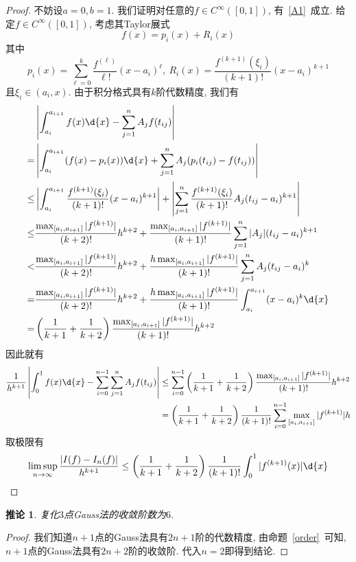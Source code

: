 \documentclass[a4paper]{ctexart}
\theoremstyle{plain}
\newtheorem{cor}[prop]{推论}
\theoremstyle{remark}
\numberwithin{equation}{section}
\begin{document}
\begin{proof}
    不妨设$a=0,b=1$.
    我们证明对任意的$f\in C^\infty([0,1])$, 有~\eqref{A1}~成立.
    给定$f\in C^\infty([0,1])$, 考虑其Taylor展式
    \[f(x)=p_i(x)+R_i(x)\]
    其中
    \[p_i(x)=\sum_{\ell=0}^k\frac{f^{(\ell)}}{\ell!}(x-a_i)^\ell,\ R_i(x)=\frac{f^{(k+1)}(\xi_i)}{(k+1)!}(x-a_i)^{k+1}\]
    且$\xi_i\in(a_i,x)$.
    由于积分格式具有$k$阶代数精度, 我们有
    \begin{align*}
        &\left|\int_{a_i}^{a_{i+1}}f(x)\d{x}-\sum_{j=1}^nA_jf(t_{ij})\right|\\
        =&\left|\int_{a_i}^{a_{i+1}}(f(x)-p_i(x))\d{x}+\sum_{j=1}^nA_j(p_i(t_{ij})-f(t_{ij}))\right|\\
        \leq&\left|\int_{a_i}^{a_{i+1}}\frac{f^{(k+1)}(\xi_i)}{(k+1)!}(x-a_i)^{k+1}\right|+\left|\sum_{j=1}^n\frac{f^{(k+1)}(\xi_i)}{(k+1)!}A_j(t_{ij}-a_i)^{k+1}\right|\\
        \leq&\frac{\max_{[a_i,a_{i+1}]}|f^{(k+1)}|}{(k+2)!}h^{k+2}+\frac{\max_{[a_i,a_{i+1}]}|f^{(k+1)}|}{(k+1)!}\sum_{j=1}^n|A_j|(t_{ij}-a_i)^{k+1}\\
        <&\frac{\max_{[a_i,a_{i+1}]}|f^{(k+1)}|}{(k+2)!}h^{k+2}+\frac{h\max_{[a_i,a_{i+1}]}|f^{(k+1)}|}{(k+1)!}\sum_{j=1}^nA_j(t_{ij}-a_i)^{k}\\
        =&\frac{\max_{[a_i,a_{i+1}]}|f^{(k+1)}|}{(k+2)!}h^{k+2}+\frac{h\max_{[a_i,a_{i+1}]}|f^{(k+1)}|}{(k+1)!}\int_{a_i}^{a_{i+1}}(x-a_i)^k\d{x}\\
        =&\left(\frac{1}{k+1}+\frac{1}{k+2}\right)\frac{\max_{[a_i,a_{i+1}]}|f^{(k+1)}|}{(k+1)!}h^{k+2}
    \end{align*}
    因此就有
    \begin{align*}
        \frac{1}{h^{k+1}}\left|\int_0^1f(x)\d{x}-\sum_{i=0}^{n-1}\sum_{j=1}^nA_jf(t_{ij})\right|&\leq\sum_{i=0}^{n-1}\left(\frac{1}{k+1}+\frac{1}{k+2}\right)\frac{\max_{[a_i,a_{i+1}]}|f^{(k+1)}|}{(k+1)!}h^{k+2}\\
        &=\left(\frac{1}{k+1}+\frac{1}{k+2}\right)\frac{1}{(k+1)!}\sum_{i=0}^{n-1}\max_{[a_i,a_{i+1}]}|f^{(k+1)}|h
    \end{align*}
    取极限有
    \[\limsup_{n\to\infty}\frac{|I(f)-I_n(f)|}{h^{k+1}}\leq\left(\frac{1}{k+1}+\frac{1}{k+2}\right)\frac{1}{(k+1)!}\int_0^1|f^{(k+1)}(x)|\d{x}\]
\end{proof}

\begin{cor}
    复化$3$点Gauss法的收敛阶数为$6$.
\end{cor}
\begin{proof}
    我们知道$n+1$点的Gauss法具有$2n+1$阶的代数精度, 由命题~\ref{order}~可知, $n+1$点的Gauss法具有$2n+2$阶的收敛阶.
    代入$n=2$即得到结论.
\end{proof}
\end{document}
